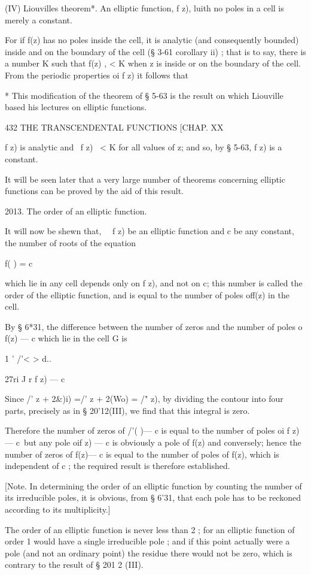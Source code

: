 (IV) Liouvilles theorem*. An elliptic function, f z), luith no poles
in a cell is merely a constant.

For if f(z) has no poles inside the cell, it is analytic (and
consequently bounded) inside and on the boundary of the cell (§ 3-61
corollary ii) ; that is to say, there is a number K such that f(z) , <
K when z is inside or on the boundary of the cell. From the periodic
properties oi f z) it follows that

* This modification of the theorem of § 5-63 is the result on which
Liouville based his lectures on elliptic functions.

432 THE TRANSCENDENTAL FUNCTIONS [CHAP. XX

f z) is analytic and \ f z) \ < K for all values of z; and so, by §
5-63, f z) is a constant.

It will be seen later that a very large number of theorems concerning
elliptic functions can be proved by the aid of this result.

2013. The order of an elliptic function.

It will now be shewn that, \ \ f z) be an elliptic function and c be
any constant, the number of roots of the equation

f( ) = c

which lie in any cell depends only on f z), and not on c; this number
is called the order of the elliptic function, and is equal to the
number of poles off(z) in the cell.

By § 6*31, the difference between the number of zeros and the number
of poles o f(z) — c which lie in the cell G is

1 ' /'< > d..

27ri J r f z) — c

Since /' z + 2\&)i) =/' z + 2(Wo) = /" z), by dividing the contour
into four parts, precisely as in § 20'12(III), we find that this
integral is zero.

Therefore the number of zeros of /'( )— c is equal to the number of
poles oi f z) — c\ but any pole oif z) — c is obviously a pole of f(z)
and conversely; hence the number of zeros of f(z)— c is equal to the
number of poles of f(z), which is independent of c ; the required
result is therefore established.

[Note. In determining the order of an elliptic function by counting
the number of its irreducible poles, it is obvious, from § 6'31, that
each pole has to be reckoned according to its multiplicity.]

The order of an elliptic function is never less than 2 ; for an
elliptic function of order 1 would have a single irreducible pole ;
and if this point actually were a pole (and not an ordinary point) the
residue there would not be zero, which is contrary to the result of §
201 2 (III).

